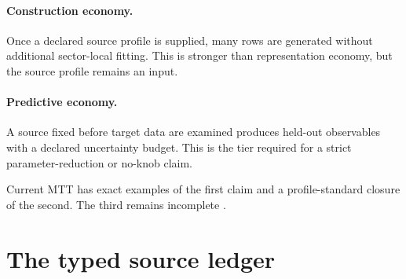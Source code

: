 \documentclass[11pt]{article}
\begin{document}
\paragraph{Construction economy.}
Once a declared source profile is supplied, many rows are generated without
additional sector-local fitting. This is stronger than representation
economy, but the source profile remains an input.

\paragraph{Predictive economy.}
A source fixed before target data are examined produces held-out observables
with a declared uncertainty budget. This is the tier required for a strict
parameter-reduction or no-knob claim.

Current MTT has exact examples of the first claim and a profile-standard
closure of the second. The third remains incomplete
\cite{MTTSuperset2026,MTTRoadmap2026}.

\section{The typed source ledger}
\end{document}

